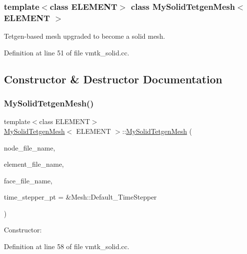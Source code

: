 \subsubsection*{template$<$class E\+L\+E\+M\+E\+NT$>$\newline
class My\+Solid\+Tetgen\+Mesh$<$ E\+L\+E\+M\+E\+N\+T $>$}

Tetgen-\/based mesh upgraded to become a solid mesh. 

Definition at line 51 of file vmtk\+\_\+solid.\+cc.



\subsection{Constructor \& Destructor Documentation}
\mbox{\label{classMySolidTetgenMesh_ac6f8d5bf403bb9da0149184c30eb6d8d}} 
\subsubsection{\texorpdfstring{My\+Solid\+Tetgen\+Mesh()}{MySolidTetgenMesh()}}
{\footnotesize\ttfamily template$<$class E\+L\+E\+M\+E\+NT$>$ \\
\hyperlink{classMySolidTetgenMesh}{My\+Solid\+Tetgen\+Mesh}$<$ E\+L\+E\+M\+E\+NT $>$\+::\hyperlink{classMySolidTetgenMesh}{My\+Solid\+Tetgen\+Mesh} (\begin{DoxyParamCaption}\item[{const std\+::string \&}]{node\+\_\+file\+\_\+name,  }\item[{const std\+::string \&}]{element\+\_\+file\+\_\+name,  }\item[{const std\+::string \&}]{face\+\_\+file\+\_\+name,  }\item[{Time\+Stepper $\ast$}]{time\+\_\+stepper\+\_\+pt = {\ttfamily \&Mesh\+:\+:Default\+\_\+TimeStepper} }\end{DoxyParamCaption})\hspace{0.3cm}{\ttfamily [inline]}}



Constructor\+: 



Definition at line 58 of file vmtk\+\_\+solid.\+cc.

\mbox{\label{classMySolidTetgenMesh_ad0e9bf1679a2ba8d3d655b95d7124e91}} 
